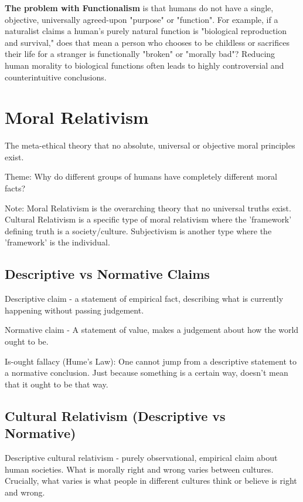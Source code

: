 \documentclass[12pt]{article}
\begin{document}
\noindent\textbf{The problem with Functionalism} is that humans do not have a single, objective, universally agreed-upon "purpose" or "function".
For example, if a naturalist claims a human's purely natural function is "biological reproduction and survival," does that mean a person who chooses to be childless or sacrifices their life for a stranger is functionally "broken" or "morally bad"?
Reducing human morality to biological functions often leads to highly controversial and counterintuitive conclusions.

\newpage

\section{Moral Relativism}
The meta-ethical theory that no absolute, universal or objective moral principles exist.

\noindent Theme: Why do different groups of humans have completely different moral facts?

\vspace{1em}
\noindent Note: Moral Relativism is the overarching theory that no universal truths exist. Cultural Relativism is a specific type of moral relativism where the 'framework' defining truth is a society/culture.
Subjectivism is another type where the 'framework' is the individual.

\subsection{Descriptive vs Normative Claims}
Descriptive claim - a statement of empirical fact, describing what is currently happening without passing judgement.

\noindent Normative claim - A statement of value, makes a judgement about how the world ought to be.

\noindent Is-ought fallacy (Hume's Law): One cannot jump from a descriptive statement to a normative conclusion.
Just because something is a certain way, doesn't mean that it ought to be that way.

\subsection{Cultural Relativism (Descriptive vs Normative)}
Descriptive cultural relativism - purely observational, empirical claim about human societies. What is morally right and wrong
varies between cultures. Crucially, what varies is what people in different cultures think or believe is right and wrong.
\end{document}
